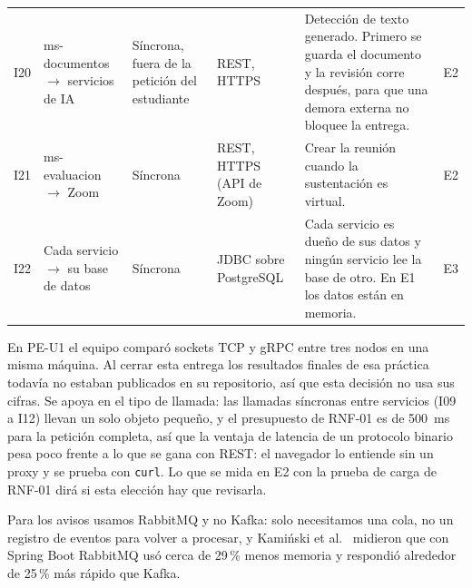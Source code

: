 \begin{longtable}{@{}L{0.8cm}L{3.1cm}L{1.8cm}L{2.6cm}L{5.1cm}L{1.3cm}@{}}
I20 & ms-documentos $\to$ servicios de IA & Síncrona, fuera de la petición del estudiante & REST, HTTPS & Detección de texto generado. Primero se guarda el documento y la revisión corre después, para que una demora externa no bloquee la entrega. & E2 \\
I21 & ms-evaluacion $\to$ Zoom & Síncrona & REST, HTTPS (API de Zoom) & Crear la reunión cuando la sustentación es virtual. & E2 \\
I22 & Cada servicio $\to$ su base de datos & Síncrona & JDBC sobre PostgreSQL & Cada servicio es dueño de sus datos y ningún servicio lee la base de otro. En E1 los datos están en memoria. & E3 \\
\end{longtable}
\endgroup

En PE-U1 el equipo comparó sockets TCP y gRPC entre tres nodos en una misma máquina. Al cerrar esta entrega los resultados finales de esa práctica todavía no estaban publicados en su repositorio, así que esta decisión no usa sus cifras. Se apoya en el tipo de llamada: las llamadas síncronas entre servicios (I09 a I12) llevan un solo objeto pequeño, y el presupuesto de RNF-01 es de 500~ms para la petición completa, así que la ventaja de latencia de un protocolo binario pesa poco frente a lo que se gana con REST: el navegador lo entiende sin un proxy y se prueba con \texttt{curl}. Lo que se mida en E2 con la prueba de carga de RNF-01 dirá si esta elección hay que revisarla.

Para los avisos usamos RabbitMQ y no Kafka: solo necesitamos una cola, no un registro de eventos para volver a procesar, y Kamiński et al.~\cite{kaminski2025rabbitmq} midieron que con Spring Boot RabbitMQ usó cerca de 29\,\% menos memoria y respondió alrededor de 25\,\% más rápido que Kafka.
